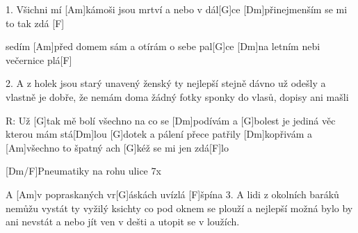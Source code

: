 
1. Všichni mí [Am]kámoši jsou mrtví a nebo v dál[G]ce
[Dm]přinejmenším se mi to tak zdá [F]

sedím [Am]před domem sám a otírám o sebe pal[G]ce
[Dm]na letním nebi večernice plá[F]


2. A z holek jsou starý unavený ženský
ty nejlepší stejně dávno už odešly
a vlastně je dobře, že nemám doma žádný fotky
sponky do vlasů, dopisy ani mašli

R: Už [G]tak mě bolí všechno na co se [Dm]podívám
a [G]bolest je jediná věc kterou mám stá[Dm]lou
[G]dotek a pálení přece patřily [Dm]kopřivám
a [Am]všechno to špatný ach [G]kéž se mi jen zdá[F]lo

[Dm/F]Pneumatiky
na rohu ulice 7x

A [Am]v popraskaných vr[G]\null áskách uvízlá [F]\null špína
3. A lidi z okolních baráků nemůžu vystát
ty vyžilý ksichty co pod oknem se plouží
a nejlepší možná bylo by ani nevstát
a nebo jít ven v dešti a utopit se v loužích.

